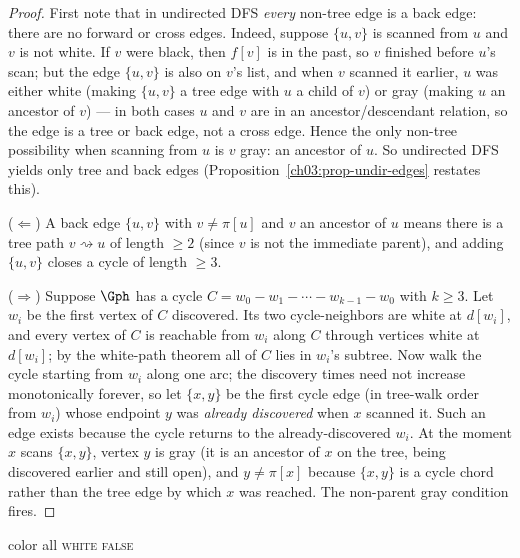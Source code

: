 \begin{proof}
First note that in undirected DFS \emph{every} non-tree edge is a back edge: there are no forward or cross edges. Indeed, suppose $\{u,v\}$ is scanned from $u$ and $v$ is not white. If $v$ were black, then $f[v]$ is in the past, so $v$ finished before $u$'s scan; but the edge $\{u,v\}$ is also on $v$'s list, and when $v$ scanned it earlier, $u$ was either white (making $\{u,v\}$ a tree edge with $u$ a child of $v$) or gray (making $u$ an ancestor of $v$) --- in both cases $u$ and $v$ are in an ancestor/descendant relation, so the edge is a tree or back edge, not a cross edge. Hence the only non-tree possibility when scanning from $u$ is $v$ gray: an ancestor of $u$. So undirected DFS yields only tree and back edges (Proposition~\ref{ch03:prop-undir-edges} restates this).

($\Leftarrow$) A back edge $\{u,v\}$ with $v\ne\pi[u]$ and $v$ an ancestor of $u$ means there is a tree path $v\rightsquigarrow u$ of length $\ge 2$ (since $v$ is not the immediate parent), and adding $\{u,v\}$ closes a cycle of length $\ge 3$.

($\Rightarrow$) Suppose $\Gph$ has a cycle $C=w_0-w_1-\cdots-w_{k-1}-w_0$ with $k\ge 3$. Let $w_i$ be the first vertex of $C$ discovered. Its two cycle-neighbors are white at $d[w_i]$, and every vertex of $C$ is reachable from $w_i$ along $C$ through vertices white at $d[w_i]$; by the white-path theorem all of $C$ lies in $w_i$'s subtree. Now walk the cycle starting from $w_i$ along one arc; the discovery times need not increase monotonically forever, so let $\{x,y\}$ be the first cycle edge (in tree-walk order from $w_i$) whose endpoint $y$ was \emph{already discovered} when $x$ scanned it. Such an edge exists because the cycle returns to the already-discovered $w_i$. At the moment $x$ scans $\{x,y\}$, vertex $y$ is gray (it is an ancestor of $x$ on the tree, being discovered earlier and still open), and $y\ne\pi[x]$ because $\{x,y\}$ is a cycle chord rather than the tree edge by which $x$ was reached. The non-parent gray condition fires.
\end{proof}

\begin{algorithm}[H]
\DontPrintSemicolon
{}
\BlankLine
color all \textsc{white}\;
\Return \textsc{false}\;
\BlankLine
{}
\caption{Undirected cycle detection (skip the entering edge by identity)}
\label{ch03:alg-undircycle}
\end{algorithm}

